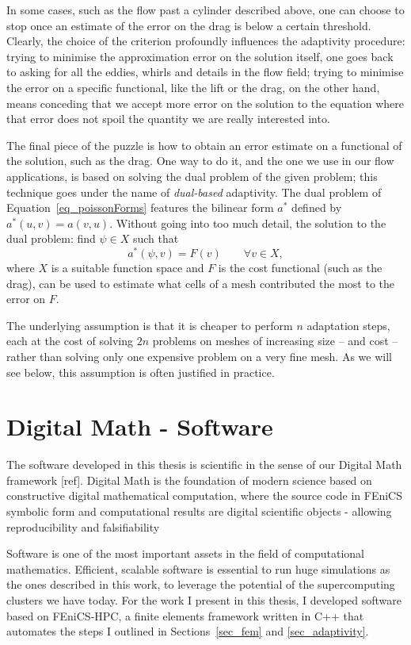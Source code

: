 In some cases, such as the flow past a cylinder described above, one can
choose to stop once an estimate of the error on the drag is below a
certain threshold.
Clearly, the choice of the criterion profoundly influences
the adaptivity procedure: trying to minimise the approximation error on
the solution itself, one goes back to asking for all the eddies, whirls
and details in the flow field; trying to minimise the error on a specific
functional, like the lift or the drag, on the other hand, means conceding
that we accept more error on the solution to the equation where that
error does not spoil the quantity we are really interested into.

The final piece of the puzzle is how to obtain an error estimate on a
functional of the solution, such as the drag.
One way to do it, and the one we use in our flow applications, is based
on solving the dual problem of the given problem; this technique goes under the
name of \emph{dual-based} adaptivity.
The dual problem of Equation~\eqref{eq_poissonForms} features the
bilinear form \(a^*\) defined by \(a^*(u, v) = a(v, u)\).
Without going into too much detail, the solution to the dual problem:
find \(\psi \in X\) such that
\begin{equation}
  a^*(\psi, v) = F(v) \qquad \forall v \in X,
  \label{eq_poissonDual}
\end{equation}
where \(X\) is a suitable function space and \(F\) is the cost functional
(such as the drag), can be used to estimate what cells of a mesh
contributed the most to the error on \(F\).

The underlying assumption is that it is cheaper to perform \(n\)
adaptation steps, each at the cost of solving \(2n\) problems on meshes of
increasing size -- and cost -- rather than solving only one expensive
problem on a very fine mesh.
As we will see below, this assumption is often justified in practice.

\section{Digital Math - Software}
\label{sec_software}
The software developed in this thesis is scientific in the sense of
our Digital Math framework [ref]. Digital Math is the foundation of modern
science based on constructive digital mathematical computation, where
the source code in FEniCS symbolic form and computational results are
digital scientific objects - allowing reproducibility and
falsifiability

Software is one of the most important assets in the field of computational mathematics.
Efficient, scalable software is essential to run huge simulations as the ones described in this work, to leverage the potential of the supercomputing clusters we have today.
For the work I present in this thesis, I developed software based on FEniCS-HPC, a finite elements framework written in C++ that automates the steps I outlined in Sections~\ref{sec_fem} and \ref{sec_adaptivity}.

